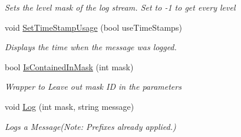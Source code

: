 \begin{DoxyCompactItemize}
\begin{DoxyCompactList}\small\item\em Sets the level mask of the log stream. Set to -\/1 to get every level \end{DoxyCompactList}\item 
void \mbox{\hyperlink{class_a_d_l_1_1_log_stream_a533f3bae752ab3ee1c3f1aaac23a7d05}{Set\+Time\+Stamp\+Usage}} (bool use\+Time\+Stamps)
\begin{DoxyCompactList}\small\item\em Displays the time when the message was logged. \end{DoxyCompactList}\item 
bool \mbox{\hyperlink{class_a_d_l_1_1_log_stream_a1a48afe31b32086d51dbc51df68a4648}{Is\+Contained\+In\+Mask}} (int mask)
\begin{DoxyCompactList}\small\item\em Wrapper to Leave out mask ID in the parameters \end{DoxyCompactList}\item 
void \mbox{\hyperlink{class_a_d_l_1_1_log_stream_a66b291a45dd593bf5b390eb82602b7ab}{Log}} (int mask, string message)
\begin{DoxyCompactList}\small\item\em Logs a Message(Note\+: Prefixes already applied.) \end{DoxyCompactList}\end{DoxyCompactItemize}
